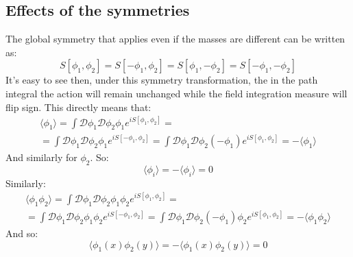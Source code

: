 \documentclass{article}
\begin{document}
\subsection{Effects of the symmetries}
The global symmetry that applies even if the masses are different can be written as:
\begin{equation}
    S[\phi_1, \phi_2] = S[-\phi_1, \phi_2] = S[\phi_1, -\phi_2] = S[-\phi_1, -\phi_2]
\end{equation}
It's easy to see then, under this symmetry transformation, the in the path integral the action will remain unchanged while the field integration measure will flip sign. This directly means that:
\begin{equation}
\begin{gathered}
    \langle \phi_1 \rangle =
    \int \mathcal{D}\phi_1\mathcal{D}\phi_2 \phi_1 e^{iS[\phi_1, \phi_2]} = \\ =
    \int \mathcal{D}\phi_1\mathcal{D}\phi_2 \phi_1 e^{iS[-\phi_1, \phi_2]} =
    \int \mathcal{D}\phi_1\mathcal{D}\phi_2 (-\phi_1) e^{iS[\phi_1, \phi_2]} =
    -\langle \phi_1 \rangle
\end{gathered}
\end{equation}
And similarly for $\phi_2$. So:
\begin{equation}
    \langle \phi_i \rangle = - \langle \phi_i \rangle = 0
\end{equation}
Similarly:
\begin{equation}
\begin{gathered}
    \langle \phi_1 \phi_2 \rangle =
    \int \mathcal{D}\phi_1\mathcal{D}\phi_2 \phi_1 \phi_2 e^{iS[\phi_1, \phi_2]} = \\ =
    \int \mathcal{D}\phi_1\mathcal{D}\phi_2 \phi_1 \phi_2 e^{iS[-\phi_1, \phi_2]} =
    \int \mathcal{D}\phi_1\mathcal{D}\phi_2 (-\phi_1) \phi_2 e^{iS[\phi_1, \phi_2]} =
    -\langle \phi_1 \phi_2 \rangle
\end{gathered}
\end{equation}
And so:
\begin{equation}
    \langle \phi_1(x) \phi_2(y) \rangle = - \langle \phi_1(x) \phi_2(y) \rangle = 0
\end{equation}
\end{document}
